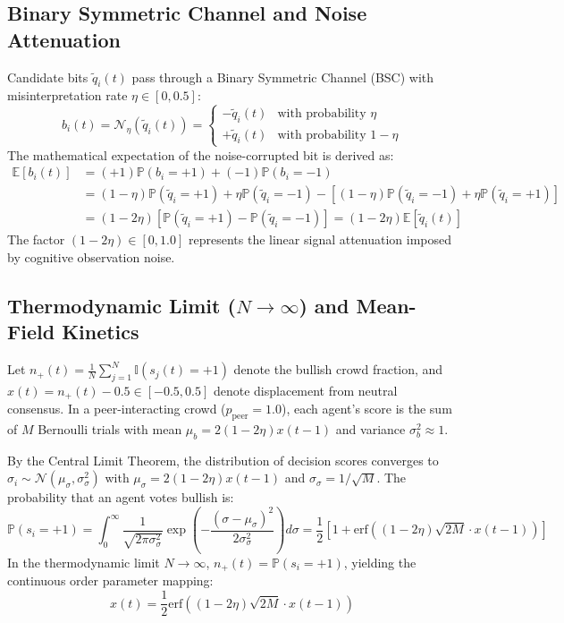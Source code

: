 \subsection{Binary Symmetric Channel and Noise Attenuation}
Candidate bits $\tilde{q}_i(t)$ pass through a Binary Symmetric Channel (BSC) with misinterpretation rate $\eta \in [0, 0.5]$:
\begin{equation}
    b_i(t) = \mathcal{N}_\eta \left( \tilde{q}_i(t) \right) = 
    \begin{cases}
        -\tilde{q}_i(t) & \text{with probability } \eta \\
        +\tilde{q}_i(t) & \text{with probability } 1 - \eta
    \end{cases}
\end{equation}
The mathematical expectation of the noise-corrupted bit is derived as:
\begin{align}
    \mathbb{E}[b_i(t)] &= (+1)\mathbb{P}(b_i = +1) + (-1)\mathbb{P}(b_i = -1) \\
    &= (1 - \eta)\mathbb{P}(\tilde{q}_i = +1) + \eta\mathbb{P}(\tilde{q}_i = -1) - \left[(1 - \eta)\mathbb{P}(\tilde{q}_i = -1) + \eta\mathbb{P}(\tilde{q}_i = +1)\right] \\
    &= (1 - 2\eta)\left[\mathbb{P}(\tilde{q}_i = +1) - \mathbb{P}(\tilde{q}_i = -1)\right] = (1 - 2\eta)\mathbb{E}[\tilde{q}_i(t)]
\end{align}
The factor $(1 - 2\eta) \in [0, 1.0]$ represents the linear signal attenuation imposed by cognitive observation noise.

\subsection{Thermodynamic Limit ($N \to \infty$) and Mean-Field Kinetics}
Let $n_+(t) = \frac{1}{N} \sum_{j=1}^N \mathbb{I}(s_j(t) = +1)$ denote the bullish crowd fraction, and $x(t) = n_+(t) - 0.5 \in [-0.5, 0.5]$ denote displacement from neutral consensus. In a peer-interacting crowd ($p_{\text{peer}}=1.0$), each agent's score is the sum of $M$ Bernoulli trials with mean $\mu_b = 2(1-2\eta)x(t-1)$ and variance $\sigma_b^2 \approx 1$.

By the Central Limit Theorem, the distribution of decision scores converges to $\sigma_i \sim \mathcal{N}(\mu_\sigma, \sigma_\sigma^2)$ with $\mu_\sigma = 2(1-2\eta)x(t-1)$ and $\sigma_\sigma = 1/\sqrt{M}$. The probability that an agent votes bullish is:
\begin{equation}
    \mathbb{P}(s_i = +1) = \int_0^\infty \frac{1}{\sqrt{2\pi \sigma_\sigma^2}} \exp\left( -\frac{(\sigma - \mu_\sigma)^2}{2\sigma_\sigma^2} \right) d\sigma = \frac{1}{2} \left[ 1 + \text{erf}\left( (1-2\eta)\sqrt{2M} \cdot x(t-1) \right) \right]
\end{equation}
In the thermodynamic limit $N \to \infty$, $n_+(t) = \mathbb{P}(s_i = +1)$, yielding the continuous order parameter mapping:
\begin{equation}
    x(t) = \frac{1}{2} \text{erf}\left( (1-2\eta)\sqrt{2M} \cdot x(t-1) \right)
\end{equation}

